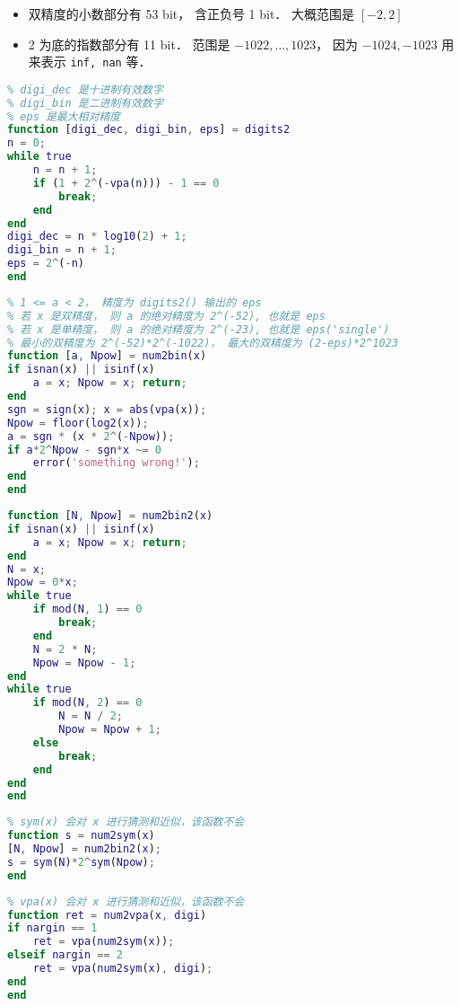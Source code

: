 

\begin{itemize}
\item 双精度的小数部分有 53 bit， 含正负号 1 bit． 大概范围是 $[-2,2]$
\item 2 为底的指数部分有 11 bit． 范围是 $-1022,\dots,1023$， 因为 $-1024, -1023$ 用来表示 \verb|inf, nan| 等．
\end{itemize}

\begin{lstlisting}[language=matlab, caption=digits2.m]
% 求当前 vpa 变精度计算的有效数字
% digi_dec 是十进制有效数字
% digi_bin 是二进制有效数字
% eps 是最大相对精度
function [digi_dec, digi_bin, eps] = digits2
n = 0;
while true
    n = n + 1;
    if (1 + 2^(-vpa(n))) - 1 == 0
        break;
    end
end
digi_dec = n * log10(2) + 1;
digi_bin = n + 1;
eps = 2^(-n)
end
\end{lstlisting}

\begin{lstlisting}[language=matlab, caption=num2bin.m]
% x = a*2^Npw (exactly)
% 1 <= a < 2， 精度为 digits2() 输出的 eps
% 若 x 是双精度， 则 a 的绝对精度为 2^(-52), 也就是 eps
% 若 x 是单精度， 则 a 的绝对精度为 2^(-23), 也就是 eps('single')
% 最小的双精度为 2^(-52)*2^(-1022)， 最大的双精度为 (2-eps)*2^1023
function [a, Npow] = num2bin(x)
if isnan(x) || isinf(x)
    a = x; Npow = x; return;
end
sgn = sign(x); x = abs(vpa(x));
Npow = floor(log2(x));
a = sgn * (x * 2^(-Npow));
if a*2^Npow - sgn*x ~= 0
    error('something wrong!');
end
end
\end{lstlisting}

\begin{lstlisting}[language=matlab, caption=num2bin2.m]
% 精确解出 x = N*2^Npow， 其中 N 是奇数和整数, Npow 是整数
function [N, Npow] = num2bin2(x)
if isnan(x) || isinf(x)
    a = x; Npow = x; return;
end
N = x;
Npow = 0*x;
while true
    if mod(N, 1) == 0
        break;
    end
    N = 2 * N;
    Npow = Npow - 1;
end
while true
    if mod(N, 2) == 0
        N = N / 2;
        Npow = Npow + 1;
    else
        break;
    end
end
end
\end{lstlisting}

\begin{lstlisting}[language=matlab, caption=num2sym.m]
% 双精度转换为符号表达式
% sym(x) 会对 x 进行猜测和近似，该函数不会
function s = num2sym(x)
[N, Npow] = num2bin2(x);
s = sym(N)*2^sym(Npow);
end
\end{lstlisting}

\begin{lstlisting}[language=matlab, caption=num2vpa.m]
% 双精度转换为变精度浮点数
% vpa(x) 会对 x 进行猜测和近似，该函数不会
function ret = num2vpa(x, digi)
if nargin == 1
    ret = vpa(num2sym(x));
elseif nargin == 2
    ret = vpa(num2sym(x), digi);
end
end
\end{lstlisting}
